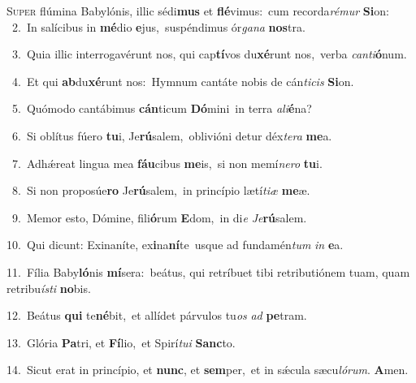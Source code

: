 \lettrine{\initial\textcolor{\initialcolor}{S}}{uper} flúmina Babylónis, illic sédi\textbf{mus} et \textbf{flé}\-vimus:~\star cum recorda\-\textit{ré}\-\textit{mur} \textbf{Si}\-on:\\
{\numbfont\textcolor{\numbcolor}{~2.}}~In salícibus in \textbf{mé}\-dio \textbf{e}\-jus,~\star suspéndimus ór\-\textit{ga}\-\textit{na} \textbf{nos}\-tra.\par
{\numbfont\textcolor{\numbcolor}{~3.}}~Quia illic interrogavérunt nos, qui cap\-\textbf{tí}\-vos du\-\textbf{xé}\-runt nos,~\star verba \textit{can}\-\textit{ti}\textbf{ó}num.\par
{\numbfont\textcolor{\numbcolor}{~4.}}~Et qui \textbf{ab}\-du\-\textbf{xé}\-runt nos:~\star Hymnum cantáte nobis de cán\-\textit{ti}\-\textit{cis} \textbf{Si}\-on.\par
{\numbfont\textcolor{\numbcolor}{~5.}}~Quómodo cantábimus \textbf{cán}\-ticum \textbf{Dó}\-mini~\star in terra \textit{a}\-\textit{li}\textbf{é}na?\par
{\numbfont\textcolor{\numbcolor}{~6.}}~Si oblítus fúero \textbf{tu}\-i, Je\-\textbf{rú}\-salem,~\star oblivióni detur déx\-\textit{te}\-\textit{ra} \textbf{me}\-a.\par
{\numbfont\textcolor{\numbcolor}{~7.}}~Adhǽreat lingua mea \textbf{fáu}\-cibus \textbf{me}\-is,~\star si non memí\-\textit{ne}\-\textit{ro} \textbf{tu}\-i.\par
{\numbfont\textcolor{\numbcolor}{~8.}}~Si non proposúe\textbf{ro} Je\-\textbf{rú}\-salem,~\star in princípio lætí\-\textit{ti}\-\textit{æ} \textbf{me}\-æ.\par
{\numbfont\textcolor{\numbcolor}{~9.}}~Memor esto, Dómine, fili\-\textbf{ó}\-rum \textbf{E}\-dom,~\star in di\textit{e} \textit{Je}\-\textbf{rú}salem.\par
{\numbfont\textcolor{\numbcolor}{10.}}~Qui dicunt: Exinaníte, ex\-\textbf{i}\-na\-\textbf{ní}\-te~\star usque ad fundamén\textit{tum} \textit{in} \textbf{e}\-a.\par
{\numbfont\textcolor{\numbcolor}{11.}}~Fília Baby\-\textbf{ló}\-nis \textbf{mí}\-sera:~\star beátus, qui retríbuet tibi retributiónem tuam, quam retribu\-\textit{ís}\-\textit{ti} \textbf{no}\-bis.\par
{\numbfont\textcolor{\numbcolor}{12.}}~Beátus \textbf{qui} te\-\textbf{né}\-bit,~\star et allídet párvulos tu\textit{os} \textit{ad} \textbf{pe}\-tram.\par
{\numbfont\textcolor{\numbcolor}{13.}}~Glória \textbf{Pa}\-tri, et \textbf{Fí}\-lio,~\star et Spirí\-\textit{tu}\-\textit{i} \textbf{Sanc}\-to.\par
{\numbfont\textcolor{\numbcolor}{14.}}~Sicut erat in princípio, et \textbf{nunc}\-, et \textbf{sem}\-per,~\star et in sǽcula sæcu\-\textit{ló}\-\textit{rum}. \textbf{A}\-men.\par
